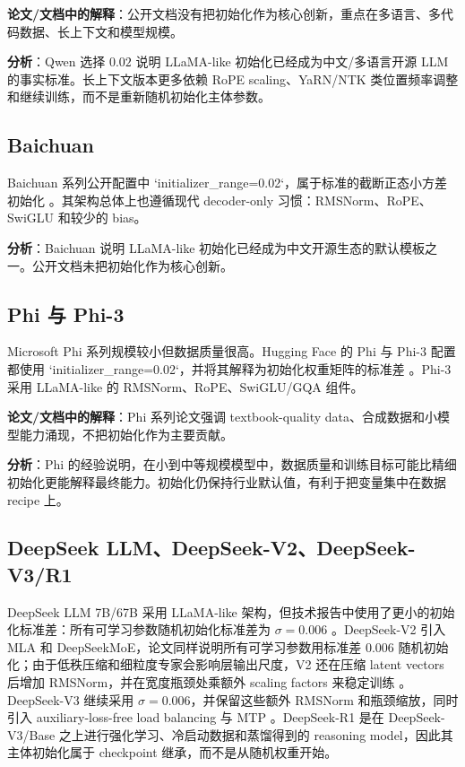 \documentclass[UTF8,a4paper,11pt]{ctexart}
\begin{document}
\textbf{论文/文档中的解释}：公开文档没有把初始化作为核心创新，重点在多语言、多代码数据、长上下文和模型规模。

\textbf{分析}：Qwen 选择 $0.02$ 说明 LLaMA-like 初始化已经成为中文/多语言开源 LLM 的事实标准。长上下文版本更多依赖 RoPE scaling、YaRN/NTK 类位置频率调整和继续训练，而不是重新随机初始化主体参数。

\subsection{Baichuan}

Baichuan 系列公开配置中 `initializer\_range=0.02`，属于标准的截断正态小方差初始化 \cite{baichuandocs}。其架构总体上也遵循现代 decoder-only 习惯：RMSNorm、RoPE、SwiGLU 和较少的 bias。

\textbf{分析}：Baichuan 说明 LLaMA-like 初始化已经成为中文开源生态的默认模板之一。公开文档未把初始化作为核心创新。

\subsection{Phi 与 Phi-3}

Microsoft Phi 系列规模较小但数据质量很高。Hugging Face 的 Phi 与 Phi-3 配置都使用 `initializer\_range=0.02`，并将其解释为初始化权重矩阵的标准差 \cite{phidocs,phi3docs}。Phi-3 采用 LLaMA-like 的 RMSNorm、RoPE、SwiGLU/GQA 组件。

\textbf{论文/文档中的解释}：Phi 系列论文强调 textbook-quality data、合成数据和小模型能力涌现，不把初始化作为主要贡献。

\textbf{分析}：Phi 的经验说明，在小到中等规模模型中，数据质量和训练目标可能比精细初始化更能解释最终能力。初始化仍保持行业默认值，有利于把变量集中在数据 recipe 上。

\subsection{DeepSeek LLM、DeepSeek-V2、DeepSeek-V3/R1}

DeepSeek LLM 7B/67B 采用 LLaMA-like 架构，但技术报告中使用了更小的初始化标准差：所有可学习参数随机初始化标准差为 $\sigma=0.006$ \cite{deepseekllm}。DeepSeek-V2 引入 MLA 和 DeepSeekMoE，论文同样说明所有可学习参数用标准差 $0.006$ 随机初始化；由于低秩压缩和细粒度专家会影响层输出尺度，V2 还在压缩 latent vectors 后增加 RMSNorm，并在宽度瓶颈处乘额外 scaling factors 来稳定训练 \cite{deepseekv2paper}。DeepSeek-V3 继续采用 $\sigma=0.006$，并保留这些额外 RMSNorm 和瓶颈缩放，同时引入 auxiliary-loss-free load balancing 与 MTP \cite{deepseekv3paper}。DeepSeek-R1 是在 DeepSeek-V3/Base 之上进行强化学习、冷启动数据和蒸馏得到的 reasoning model，因此其主体初始化属于 checkpoint 继承，而不是从随机权重开始。
\end{document}
